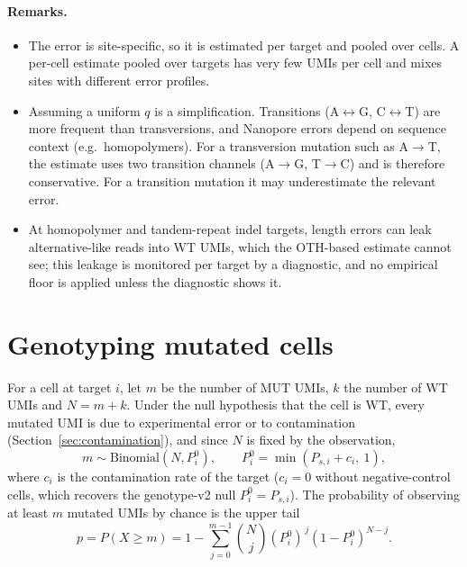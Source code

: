 \documentclass[11pt]{article}
\begin{document}
\paragraph{Remarks.}
\begin{itemize}
\item The error is site-specific, so it is estimated per target and pooled over cells. A per-cell estimate pooled over targets has very few UMIs per cell and mixes sites with different error profiles.
\item Assuming a uniform $q$ is a simplification. Transitions (A$\leftrightarrow$G, C$\leftrightarrow$T) are more frequent than transversions, and Nanopore errors depend on sequence context (e.g.\ homopolymers). For a transversion mutation such as A$\to$T, the estimate uses two transition channels (A$\to$G, T$\to$C) and is therefore conservative. For a transition mutation it may underestimate the relevant error.
\item At homopolymer and tandem-repeat indel targets, length errors can leak alternative-like reads into WT UMIs, which the OTH-based estimate cannot see; this leakage is monitored per target by a diagnostic, and no empirical floor is applied unless the diagnostic shows it.
\end{itemize}

\section{Genotyping mutated cells}
\label{sec:genotyping}

For a cell at target $i$, let $m$ be the number of MUT UMIs, $k$ the number of WT UMIs and $N=m+k$. Under the null hypothesis that the cell is WT, every mutated UMI is due to experimental error or to contamination (Section~\ref{sec:contamination}), and since $N$ is fixed by the observation,
\begin{equation}
m \sim \text{Binomial}(N, P^{0}_{i}), \qquad P^{0}_{i} = \min(P_{s,i} + c_i,\ 1),
\end{equation}
where $c_i$ is the contamination rate of the target ($c_i = 0$ without negative-control cells, which recovers the genotype-v2 null $P^{0}_i = P_{s,i}$). The probability of observing at least $m$ mutated UMIs by chance is the upper tail
\begin{equation}
p = P(X \geq m) = 1 - \sum_{j=0}^{m-1} \binom{N}{j} (P^{0}_{i})^{\,j} (1-P^{0}_{i})^{N-j}.
\end{equation}
\end{document}
